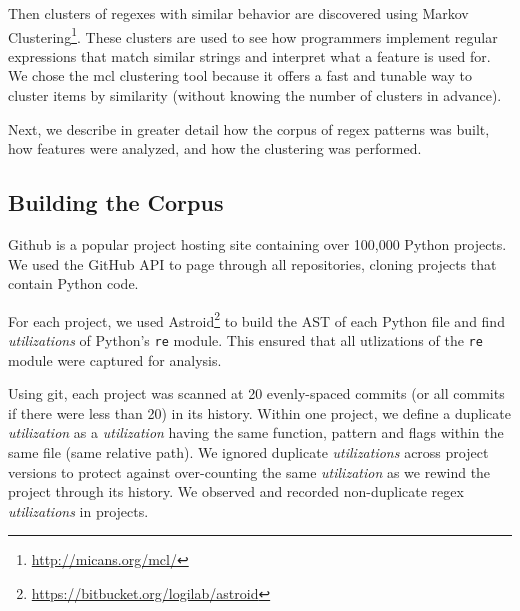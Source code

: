 Then clusters of regexes with similar behavior are discovered using Markov Clustering\footnote{\url{http://micans.org/mcl/}}.  These clusters are used to see how programmers implement regular expressions that match similar strings and interpret what a feature is used for.
 We chose the mcl clustering tool because it offers a fast and tunable way to cluster items by similarity (without knowing the number of clusters in advance).


Next, we describe in greater detail how the corpus of regex patterns was built, how features were analyzed, and how the clustering was performed.




\subsection{Building the Corpus}
\label{study:corpus}
Github is a popular project hosting site containing over 100,000 Python projects.
We used the GitHub API to page through all repositories, cloning projects that contain Python code. 

For each project, we used Astroid\footnote{\url{https://bitbucket.org/logilab/astroid}} to build the AST of each Python file and find \emph{utilizations} of Python's {\tt re} module. This ensured that all utlizations of the {\tt re} module were captured for analysis.

Using git, each project was scanned at 20 evenly-spaced commits (or all commits if there were less than 20) in its history.
Within one project, we define a duplicate \emph{utilization} as a \emph{utilization} having the same function, pattern and flags within the same file (same relative path).  We ignored duplicate \emph{utilizations} across project versions to protect against over-counting the same \emph{utilization} as we rewind the project through its history.  We observed and recorded  non-duplicate regex \emph{utilizations} in  projects.

